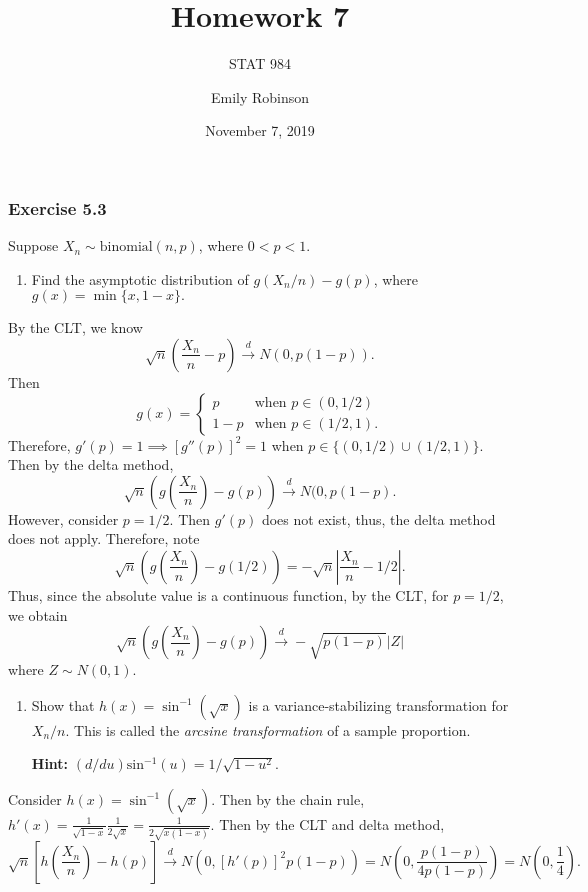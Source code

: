 \documentclass[12pt,]{article}
\title{Homework 7}
\subtitle{STAT 984}
\author{Emily Robinson}
\date{November 7, 2019}
\providecommand{\tightlist}{%
  \setlength{\itemsep}{0pt}\setlength{\parskip}{0pt}}
\begin{document}
\maketitle

\hypertarget{exercise-5.3}{%
\subsubsection{Exercise 5.3}\label{exercise-5.3}}

Suppose \(X_n \sim \text{binomial}(n,p)\), where \(0<p<1\).

\begin{enumerate}
\def\labelenumi{(\alph{enumi})}
\tightlist
\item
  Find the asymptotic distribution of \(g(X_n/n)-g(p)\), where
  \(g(x) = \min\{x,1-x\}.\)
\end{enumerate}

By the CLT, we know
\[\sqrt{n}\left(\frac{X_n}{n}-p\right)\overset{d}\rightarrow N\left(0, p(1-p)\right).\]
Then \[g(x) = \begin{cases}
                                   p & \text{when } p\in (0,1/2) \\
                                   1-p & \text{when } p\in (1/2,1).
        \end{cases}\] Therefore, \(g'(p)=1\implies [g''(p)]^2=1\) when
\(p \in \{(0,1/2)\cup (1/2,1)\}.\) Then by the delta method,
\[\sqrt{n}\left(g\left(\frac{X_n}{n}\right)-g(p)\right)\overset{d}\rightarrow N(0,p(1-p).\]
However, consider \(p=1/2.\) Then \(g'(p)\) does not exist, thus, the
delta method does not apply. Therefore, note
\[\sqrt{n}\left(g\left(\frac{X_n}{n}\right)-g(1/2)\right)=-\sqrt{n}\left|\frac{X_n}{n}-1/2\right|.\]
Thus, since the absolute value is a continuous function, by the CLT, for
\(p=1/2\), we obtain
\[\sqrt{n}\left(g\left(\frac{X_n}{n}\right)-g(p)\right)\overset{d}\rightarrow -\sqrt{p(1-p)}|Z|\]
where \(Z\sim N(0,1)\).

\begin{enumerate}
\def\labelenumi{(\alph{enumi})}
\setcounter{enumi}{1}
\item
  Show that \(h(x) = \sin ^{-1}(\sqrt{x})\) is a variance-stabilizing
  transformation for \(X_n/n\). This is called the
  \textit{arcsine transformation} of a sample proportion.

  \textbf{Hint:} \((d/du)\text{sin}^{-1}(u) = 1/\sqrt{1-u^2}\).
\end{enumerate}

Consider \(h(x)=\sin^{-1}(\sqrt{x}).\) Then by the chain rule,
\(h'(x)=\frac{1}{\sqrt{1-x}}\frac{1}{2\sqrt{x}}=\frac{1}{2\sqrt{x(1-x)}}\).
Then by the CLT and delta method,
\[\sqrt{n}\left[h\left(\frac{X_n}{n}\right)-h(p)\right]\overset{d}\rightarrow N\left(0,[h'(p)]^2p(1-p)\right)=N\left(0,\frac{p(1-p)}{4p(1-p)}\right)=N\left(0,\frac{1}{4}\right).\]
\end{document}
